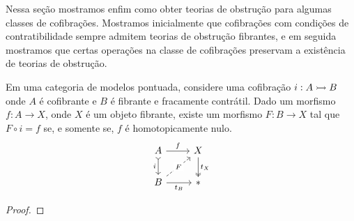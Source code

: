 Nessa seção mostramos enfim como obter teorias de obstrução para algumas classes de cofibrações.
Mostramos inicialmente que cofibrações com condições de contratibilidade sempre admitem teorias de obstrução fibrantes, e em seguida mostramos que certas operações na classe de cofibrações preservam a existência de teorias de obstrução.

\begin{prop}
  Em uma categoria de modelos pontuada, considere uma cofibração $i: A \rightarrowtail B$ onde $A$ é cofibrante e $B$ é fibrante e fracamente contrátil.
  Dado um morfismo $f: A \to X$, onde $X$ é um objeto fibrante, existe um morfismo $F: B \to X$ tal que $F \circ i = f$ se, e somente se, $f$ é homotopicamente nulo.
  \begin{displaymath}
    \begin{tikzcd}
      A
      \arrow[r, "f"]
      \arrow[d, tail, "i" swap]
      & X
      \arrow[d, two heads, "t_{X}"]
      \\ B
      \arrow[r, "t_{B}" swap]
      \arrow[ru, dashed, "F" description]
      & *
    \end{tikzcd}
  \end{displaymath}
\end{prop}

\begin{proof}
  
\end{proof}





